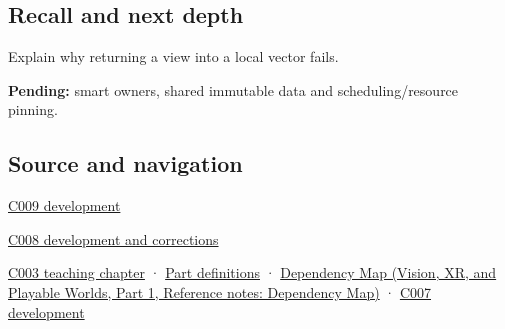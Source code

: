 \subsection{Recall and next depth}\label{appendix-d52e4486f527-recall-and-next-depth}

\hypertarget{appendix-d52e4486f527-recall-and-next-depth}{}

Explain why returning a view into a local vector fails.

\textbf{Pending:} smart owners, shared immutable data and scheduling/resource pinning.

\subsection{Source and navigation}\label{appendix-d52e4486f527-source-and-navigation}

\hypertarget{appendix-d52e4486f527-source-and-navigation}{}

\hyperref[appendix-fd090d982a15-m009---parts-127-147]{C009 development}

\hyperref[appendix-fd090d982a15-m008---parts-113-126]{C008 development and corrections}

\hyperref[01-foundations-i-ch002-where-the-bytes-live]{C003 teaching chapter} · \hyperref[appendix-fd090d982a15-m003---parts-41-60]{Part definitions} · \href{../07-Vision-XR-and-Playable-Worlds-P01/main.pdf\#appendix-4ad47bdd269a}{Dependency Map (Vision, XR, and Playable Worlds, Part 1, Reference notes: Dependency Map)} · \hyperref[01-foundations-i-ch003-bringing-the-object-model-back-to-bytes]{C007 development}

